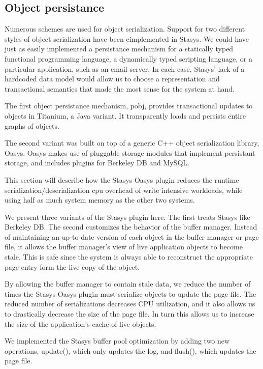 \documentclass[letterpaper,twocolumn,10pt]{article}
\newcommand{\yad}{Stasys\xspace}
\newcommand{\yads}{Stasys'\xspace}
\newcommand{\oasys}{Oasys\xspace}
\begin{document}
\subsection{Object persistance}
Numerous schemes are used for object serialization.  Support for two
different styles of object serialization have been eimplemented in
\yad.  We could have just as easily implemented a persistance
mechanism for a statically typed functional programming language, a
dynamically typed scripting language, or a particular application,
such as an email server.  In each case, \yads lack of a hardcoded data
model would allow us to choose a representation and transactional
semantics that made the most sense for the system at hand.

The first object persistance mechanism, pobj, provides transactional updates to objects in
Titanium, a Java variant.  It transparently loads and persists
entire graphs of objects.

The second variant was built on top of a generic C++ object
serialization library, \oasys.  \oasys makes use of pluggable storage
modules that implement persistant storage, and includes plugins
for Berkeley DB and MySQL.  

This section will describe how the \yad
\oasys plugin reduces the runtime serialization/deserialization cpu
overhead of write intensive workloads, while using half as much system
memory as the other two systems.

We present three variants of the \yad plugin here.  The first treats \yad like
Berkeley DB.  The second customizes the behavior of the buffer
manager.  Instead of maintaining an up-to-date version of each object
in the buffer manager or page file, it allows the buffer manager's
view of live application objects to become stale.  This is safe since
the system is always able to reconstruct the appropriate page entry
form the live copy of the object.

By allowing the buffer manager to contain stale data, we reduce the
number of times the \yad \oasys plugin must serialize objects to
update the page file.  The reduced number of serializations decreases
CPU utilization, and it also allows us to drastically decrease the
size of the page file.  In turn this allows us to increase the size of
the application's cache of live objects.

We implemented the \yad buffer pool optimization by adding two new
operations, update(), which only updates the log, and flush(), which
updates the page file.  
\end{document}
